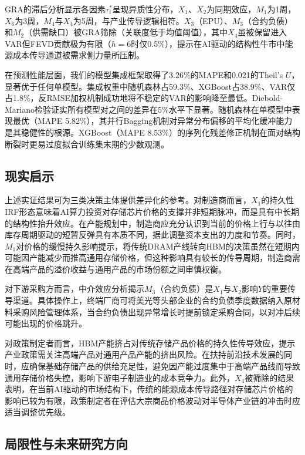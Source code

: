 \documentclass[a4paper,12pt,fontset=fandol]{ctexart}
\begin{document}
GRA的滞后分析显示各因素$\tau_i^*$呈现异质性分布，$X_1$、$X_2$为同期效应，$M_1$为1周，$X_6$为3周，$M_4$与$X_4$为5周，与产业传导逻辑相符。$X_3$（EPU）、$M_3$（合约负债）和$M_2$（供需缺口）被GRA筛除（关联度低于均值阈值），其中$X_4$虽被保留进入VAR但FEVD贡献极为有限（$h=6$时仅0.5\%），提示在AI驱动的结构性牛市中能源成本传导通道被需求侧力量所压制。

在预测性能层面，我们的模型集成框架取得了3.26\%的MAPE和0.021的Theil's $U$，显著优于任何单模型。集成权重中随机森林占59.3\%、XGBoost占38.9\%、VAR仅占1.8\%，反RMSE加权机制成功地将不稳定的VAR的影响降至最低。Diebold-Mariano检验证实所有模型对之间的差异在5\%水平下显著。随机森林在单模型中表现最优（MAPE 5.82\%），其并行Bagging机制对异常分布偏移的平均化缓冲能力是其稳健性的根源。XGBoost（MAPE 8.53\%）的序列化残差修正机制在面对结构断裂时更易过度拟合训练集末期的少数观测。

\subsection{现实启示}

上述实证结果可为三类决策主体提供差异化的参考。对制造商而言，$X_1$的持久性IRF形态意味着AI算力投资对存储芯片价格的支撑并非短期脉冲，而是具有中长期的结构性抬升效应。在产能规划中，制造商应充分认识到当前的价格上行与以往由库存周期驱动的短暂反弹具有本质不同，据此调整资本支出的力度和节奏。同时，$M_1$对价格的缓慢持久影响提示，将传统DRAM产线转向HBM的决策虽然在短期内可能因产能减少而推高通用存储价格，但这种影响具有较长的传导周期，制造商需在高端产品的溢价收益与通用产品的市场份额之间审慎权衡。

对下游采购方而言，中介效应分析揭示$M_3$（合约负债）是$X_1$与$X_2$影响$Y$的重要传导渠道。具体操作上，终端厂商可将美光等头部企业的合约负债季度数据纳入原材料采购风险管理体系，当合约负债出现异常增长时提前锁定采购合同，以对冲后续可能出现的价格跳升。

对政策制定者而言，HBM产能挤占对传统存储产品价格的持久性传导效应，提示产业政策需关注高端产品对通用产品产能的挤出风险。在扶持前沿技术发展的同时，应确保基础存储产品的供给充足性，避免因产能过度集中于高端产品线而导致通用存储价格失控，影响下游电子制造业的成本竞争力。此外，$X_4$被筛除的结果表明，在当前AI驱动的市场结构下，传统的能源成本传导路径对存储芯片价格的影响已较为有限，政策制定者在评估大宗商品价格波动对半导体产业链的冲击时应适当调整优先级。

\subsection{局限性与未来研究方向}
\end{document}
